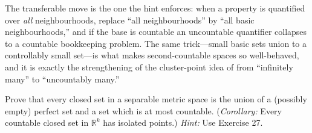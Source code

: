 \documentclass[main.tex]{subfiles}
\begin{document}
\begin{Reflection}
The transferable move is the one the hint enforces: when a property is quantified over \emph{all}
neighbourhoods, replace ``all neighbourhoods'' by ``all basic neighbourhoods,'' and if the base is
countable an uncountable quantifier collapses to a countable bookkeeping problem. The same trick---small
basic sets union to a controllably small set---is what makes second-countable spaces so well-behaved, and
it is exactly the strengthening of the cluster-point idea of  from ``infinitely many'' to
``uncountably many.''
\end{Reflection}

Prove that every closed set in a separable metric space is the union of a (possibly empty) perfect set
and a set which is at most countable. (\emph{Corollary:} Every countable closed set in $\mathbb R^k$ has
isolated points.) \emph{Hint:} Use Exercise 27.
\end{document}
